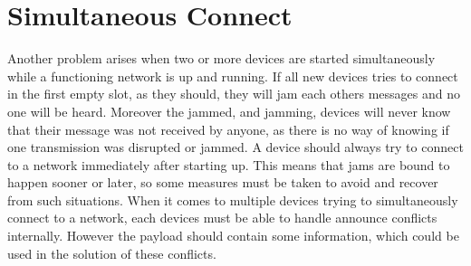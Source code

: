 \section{Simultaneous Connect} %
\label{sec:simultaneous_connect}

Another problem arises when two or more devices are started simultaneously while a functioning network is up and running.
If all new devices tries to connect in the first empty slot, as they should, they will jam each others messages and no one will be heard.
Moreover the jammed, and jamming, devices will never know that their message was not received by anyone, as there is no way of knowing if one transmission was disrupted or jammed.
A device should always try to connect to a network immediately after starting up.
This means that jams are bound to happen sooner or later, so some measures must be taken to avoid and recover from such situations.
When it comes to multiple devices trying to simultaneously connect to a network, each devices must be able to handle announce conflicts internally.
However the payload should contain some information, which could be used in the solution of these conflicts.

